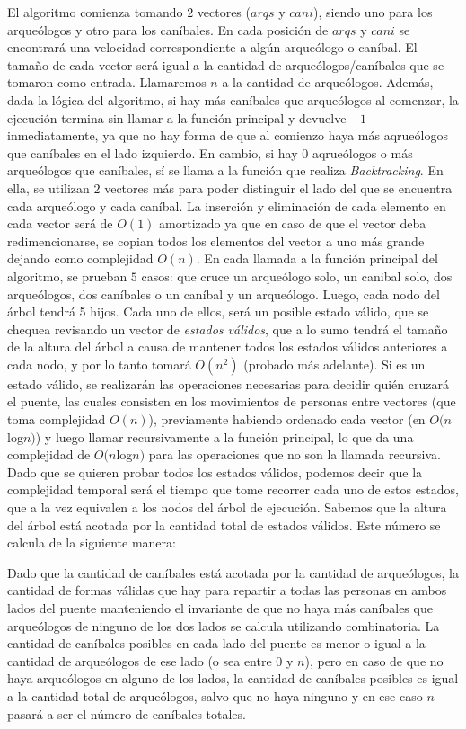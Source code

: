       El algoritmo comienza tomando $2$ vectores ($arqs$ y $cani$), siendo uno para los arqueólogos y otro para los caníbales. En cada posición de $arqs$ y $cani$ se encontrará una velocidad correspondiente a algún arqueólogo o caníbal. El tamaño de cada vector será igual a la cantidad de arqueólogos/caníbales que se tomaron como entrada. Llamaremos $n$ a la cantidad de arqueólogos. Además, dada la lógica del algoritmo, si hay más caníbales que arqueólogos al comenzar, la ejecución termina sin llamar a la función principal y devuelve $-1$ inmediatamente, ya que no hay forma de que al comienzo haya más aqrueólogos que caníbales en el lado izquierdo. En cambio, si hay $0$ aqrueólogos o más arqueólogos que caníbales, sí se llama a la función que realiza \emph{Backtracking}.
      En ella, se utilizan $2$ vectores más para poder distinguir el lado del que se encuentra cada arqueólogo y cada caníbal. La inserción y eliminación de cada elemento en cada vector será de $O(1)$ amortizado ya que en caso de que el vector deba redimencionarse, se copian todos los elementos del vector a uno más grande dejando como complejidad $O(n)$.
      En cada llamada a la función principal del algoritmo, se prueban $5$ casos: que cruce un arqueólogo solo, un canibal solo, dos arqueólogos, dos caníbales o un caníbal y un arqueólogo. Luego, cada nodo del árbol tendrá 5 hijos. Cada uno de ellos, será un posible estado válido, que se chequea revisando un vector de \emph{estados válidos}, que a lo sumo tendrá el tamaño de la altura del árbol a causa de mantener todos los estados válidos anteriores a cada nodo, y por lo tanto tomará $O(n^2)$ (probado más adelante). Si es un estado válido, se realizarán las operaciones necesarias para decidir quién cruzará el puente, las cuales consisten en los movimientos de personas entre vectores (que toma complejidad $O(n)$), previamente habiendo ordenado cada vector (en $O(n $log$ n)$) y luego llamar recursivamente a la función principal, lo que da una complejidad de $O(n $log$ n)$ para las operaciones que no son la llamada recursiva. Dado que se quieren probar todos los estados válidos, podemos decir que la complejidad temporal será el tiempo que tome recorrer cada uno de estos estados, que a la vez equivalen a los nodos del árbol de ejecución. Sabemos que la altura del árbol está acotada por la cantidad total de estados válidos. Este número se calcula de la siguiente manera:

      Dado que la cantidad de caníbales está acotada por la cantidad de arqueólogos, la cantidad de formas válidas que hay para repartir a todas las personas en ambos lados del puente manteniendo el invariante de que no haya más caníbales que arqueólogos de ninguno de los dos lados se calcula utilizando combinatoria. La cantidad de caníbales posibles en cada lado del puente es menor o igual a la cantidad de arqueólogos de ese lado (o sea entre $0$ y $n$), pero en caso de que no haya arqueólogos en alguno de los lados, la cantidad de caníbales posibles es igual a la cantidad total de arqueólogos, salvo que no haya ninguno y en ese caso $n$ pasará a ser el número de caníbales totales.


